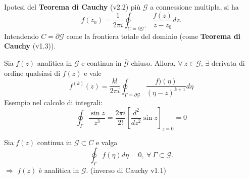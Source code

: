 \begin{theorem}[di Cauchy (v2.3)]
    Ipotesi del \textbf{Teorema di Cauchy} (v2.2) più $\mathcal{G}$ a connessione multipla, si ha
    \[
        f(z_0) = \frac{1}{2\pi i} \oint_{C=\partial\mathcal{G}^+}\frac{f(z)}{z-z_0}dz.
    \]
    Intendendo $C=\partial\mathcal{G}$ come la frontiera totale del dominio (come \textbf{Teorema di Cauchy} (v1.3)).
\end{theorem}
\begin{ddfa}
    Sia $f(z)$ analitica in $\mathcal{G}$ e continua in $\overline{\mathcal{G}}$ chiuso. Allora, $\forall\ z\in\mathcal{G}$, $\exists$ derivata di ordine qualsiasi di $f(z)$ e vale
    \[
        f^{(k)}(z) = \frac{k!}{2\pi i}\oint_{\Gamma=\partial\mathcal{G}}\frac{f)(\eta)}{(\eta-z)^{k+1}}d\eta
    \]
    Esempio nel calcolo di integrali:
    \[
        \oint_{\Gamma}\frac{\sin z}{z^3} = \frac{2\pi i}{2!}\left[\frac{d^2}{dz^2}\sin z \right]_{z=0} = 0
    \]
\end{ddfa}
\begin{theorem}[di Morera]
    Sia $f(z)$ continua in $\mathcal{G} \subset C$ e valga 
    \[
        \oint_\Gamma f(\eta)d\eta = 0, \ \forall \ \Gamma\subset\mathcal{G}.
    \]
    $\Rightarrow$ $f(z)$ è analitica in $\mathcal{G}$. (inverso di Cauchy v1.1)
\end{theorem}
